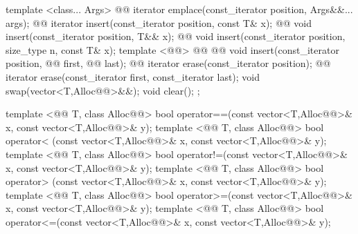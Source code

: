 \documentclass[american,twoside]{book}
\begin{document}
\begin{codeblock}
{{    template <class... Args> 
      @@
      iterator emplace(const_iterator position, Args&&... args);
    @@ 
      iterator insert(const_iterator position, const T& x);
    @@
      void insert(const_iterator position, T&& x);
    @@
      void insert(const_iterator position, size_type n, const T& x);
    template <@@>
        @@
              @@
        void insert(const_iterator position,
                    @@ first, @@ last);
    @@ iterator erase(const_iterator position);
    @@ iterator erase(const_iterator first, const_iterator last);
    void     swap(vector<T,Alloc@@>&&);
    void     clear();
  };

  template <@@ T, class Alloc@@>
    bool operator==(const vector<T,Alloc@@>& x, const vector<T,Alloc@@>& y);
  template <@@ T, class Alloc@@>
    bool operator< (const vector<T,Alloc@@>& x, const vector<T,Alloc@@>& y);
  template <@@ T, class Alloc@@>
    bool operator!=(const vector<T,Alloc@@>& x, const vector<T,Alloc@@>& y);
  template <@@ T, class Alloc@@>
    bool operator> (const vector<T,Alloc@@>& x, const vector<T,Alloc@@>& y);
  template <@@ T, class Alloc@@>
    bool operator>=(const vector<T,Alloc@@>& x, const vector<T,Alloc@@>& y);
  template <@@ T, class Alloc@@>
    bool operator<=(const vector<T,Alloc@@>& x, const vector<T,Alloc@@>& y);

}
\end{codeblock}
\end{document}
